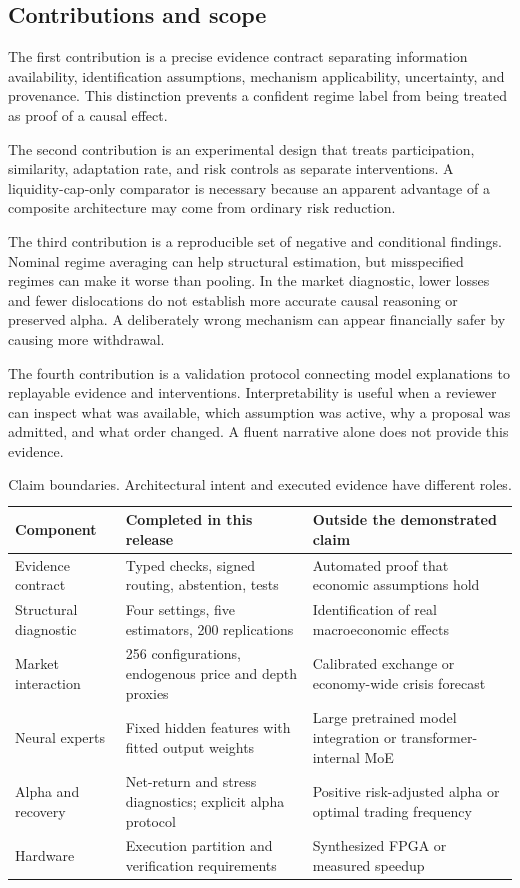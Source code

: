\subsection{Contributions and scope}
The first contribution is a precise evidence contract separating information availability, identification assumptions, mechanism applicability, uncertainty, and provenance. This distinction prevents a confident regime label from being treated as proof of a causal effect.

The second contribution is an experimental design that treats participation, similarity, adaptation rate, and risk controls as separate interventions. A liquidity-cap-only comparator is necessary because an apparent advantage of a composite architecture may come from ordinary risk reduction.

The third contribution is a reproducible set of negative and conditional findings. Nominal regime averaging can help structural estimation, but misspecified regimes can make it worse than pooling. In the market diagnostic, lower losses and fewer dislocations do not establish more accurate causal reasoning or preserved alpha. A deliberately wrong mechanism can appear financially safer by causing more withdrawal.

The fourth contribution is a validation protocol connecting model explanations to replayable evidence and interventions. Interpretability is useful when a reviewer can inspect what was available, which assumption was active, why a proposal was admitted, and what order changed. A fluent narrative alone does not provide this evidence.

\begin{table}[htbp]\centering\small
\begin{tabularx}{\linewidth}{p{.22\linewidth}XX}
\toprule Component & Completed in this release & Outside the demonstrated claim\\\midrule
Evidence contract & Typed checks, signed routing, abstention, tests & Automated proof that economic assumptions hold\\
Structural diagnostic & Four settings, five estimators, 200 replications & Identification of real macroeconomic effects\\
Market interaction & 256 configurations, endogenous price and depth proxies & Calibrated exchange or economy-wide crisis forecast\\
Neural experts & Fixed hidden features with fitted output weights & Large pretrained model integration or transformer-internal MoE\\
Alpha and recovery & Net-return and stress diagnostics; explicit alpha protocol & Positive risk-adjusted alpha or optimal trading frequency\\
Hardware & Execution partition and verification requirements & Synthesized FPGA or measured speedup\\
\bottomrule
\end{tabularx}
\caption{Claim boundaries. Architectural intent and executed evidence have different roles.}
\end{table}

